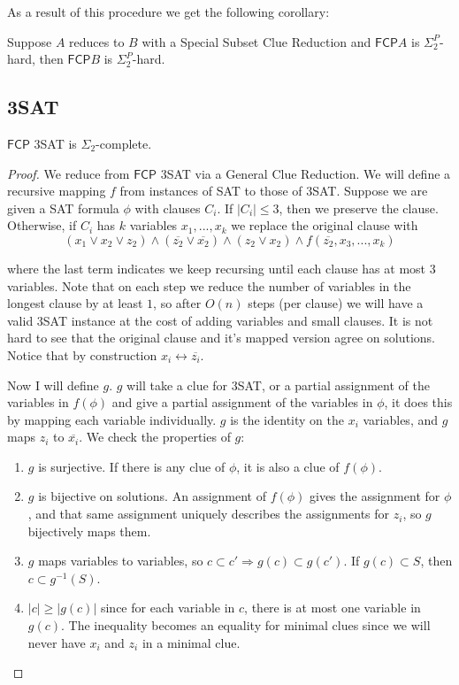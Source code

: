 \documentclass[runningheads,a4paper]{llncs}
\begin{document}
As a result of this procedure we get the following corollary: 

\begin{corollary}
\label{thm:special_reduc}
Suppose $A$ reduces to $B$ with a Special Subset Clue Reduction and $\mathsf{FCP} A$ is $\Sigma_2^P$-hard, then $\mathsf{FCP} B$ is $\Sigma_2^P$-hard. 
\end{corollary}

\subsection{3SAT}

\begin{theorem}
$\mathsf{FCP}$ 3SAT is $\Sigma_2$-complete. 
\end{theorem} 

\begin{proof}
We reduce from $\mathsf{FCP}$ 3SAT via a General Clue Reduction. We will define a recursive mapping $f$ from instances of SAT to those of 3SAT. Suppose we are given a SAT formula $\phi$ with clauses $C_i$. If $|C_i| \leq 3$, then we preserve the clause. Otherwise, if $C_i$ has $k$ variables $x_1,...,x_k$ we replace the original clause with 
\[ 
(x_1 \vee x_2 \vee z_2) \wedge (\overline{z_2} \vee \overline{x_2}) \wedge (z_2 \vee x_2) \wedge f(\overline{z_2}, x_3, ..., x_k) 
\]

where the last term indicates we keep recursing until each clause has at most $3$ variables. Note that on each step we reduce the number of variables in the longest clause by at least $1$, so after $O(n)$ steps (per clause) we will have a valid 3SAT instance at the cost of adding variables and small clauses. It is not hard to see that the original clause and it's mapped version agree on solutions. Notice that by construction $x_i \leftrightarrow \overline{z_i}$. 

Now I will define $g$. $g$ will take a clue for 3SAT, or a partial assignment of the variables in $f(\phi)$ and give a partial assignment of the variables in $\phi$, it does this by mapping each variable individually. $g$ is the identity on the $x_i$ variables, and $g$ maps $z_i$ to $\overline{x_i}$. We check the properties of $g$:
\begin{enumerate}
\item $g$ is surjective. If there is any clue of $\phi$, it is also a clue of $f(\phi)$. 
\item $g$ is bijective on solutions. An assignment of $f(\phi)$ gives the assignment for $\phi$, and that same assignment uniquely describes the assignments for $z_i$, so $g$ bijectively maps them.
\item $g$ maps variables to variables, so $c \subset c' \Rightarrow g(c) \subset g(c')$. If $g(c) \subset S$, then $c \subset g^{-1}(S)$. 
\item $|c| \geq |g(c)|$ since for each variable in $c$, there is at most one variable in $g(c)$. The inequality becomes an equality for minimal clues since we will never have $x_i$ and $z_i$ in a minimal clue.
\end{enumerate}
\end{proof}
\end{document}
